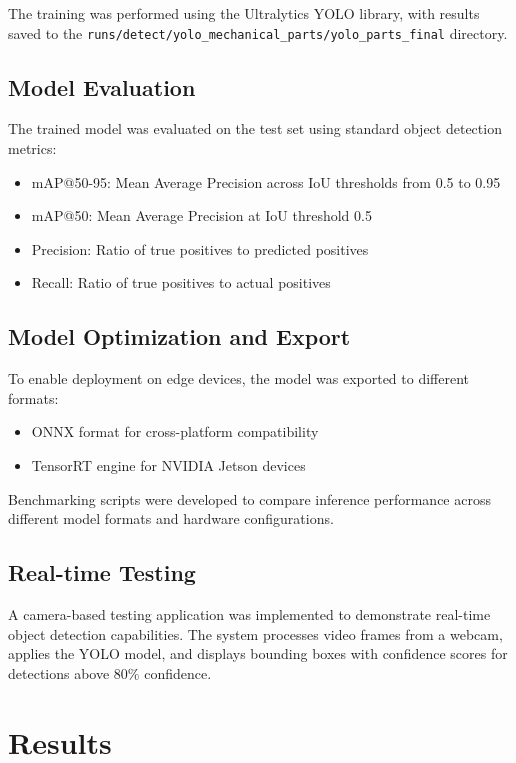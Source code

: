 \documentclass[12pt,a4paper]{article}
\begin{document}
The training was performed using the Ultralytics YOLO library, with results saved to the \texttt{runs/detect/yolo\_mechanical\_parts/yolo\_parts\_final} directory.

\subsection{Model Evaluation}

The trained model was evaluated on the test set using standard object detection metrics:
\begin{itemize}
\item mAP@50-95: Mean Average Precision across IoU thresholds from 0.5 to 0.95
\item mAP@50: Mean Average Precision at IoU threshold 0.5
\item Precision: Ratio of true positives to predicted positives
\item Recall: Ratio of true positives to actual positives
\end{itemize}

\subsection{Model Optimization and Export}

To enable deployment on edge devices, the model was exported to different formats:
\begin{itemize}
\item ONNX format for cross-platform compatibility
\item TensorRT engine for NVIDIA Jetson devices
\end{itemize}

Benchmarking scripts were developed to compare inference performance across different model formats and hardware configurations.

\subsection{Real-time Testing}

A camera-based testing application was implemented to demonstrate real-time object detection capabilities. The system processes video frames from a webcam, applies the YOLO model, and displays bounding boxes with confidence scores for detections above 80\% confidence.

\section{Results}
\end{document}
